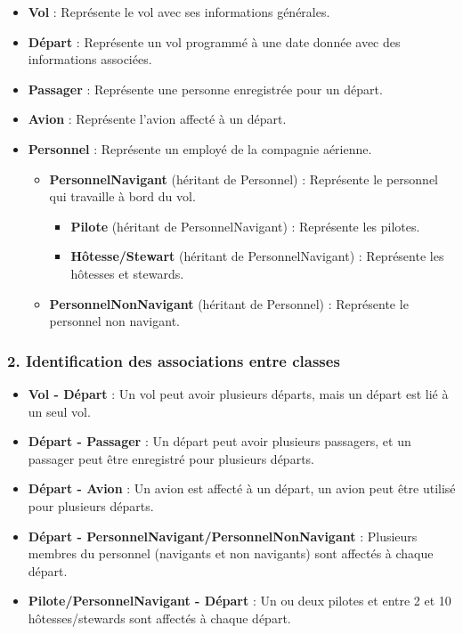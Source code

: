 \documentclass{article}
\begin{document}
\begin{itemize}
  \item \textbf{Vol} : Représente le vol avec ses informations générales.
  \item \textbf{Départ} : Représente un vol programmé à une date donnée avec des informations associées.
  \item \textbf{Passager} : Représente une personne enregistrée pour un départ.
  \item \textbf{Avion} : Représente l’avion affecté à un départ.
  \item \textbf{Personnel} : Représente un employé de la compagnie aérienne.
  \begin{itemize}
    \item \textbf{PersonnelNavigant} (héritant de Personnel) : Représente le personnel qui travaille à bord du vol.
    \begin{itemize}
      \item \textbf{Pilote} (héritant de PersonnelNavigant) : Représente les pilotes.
      \item \textbf{Hôtesse/Stewart} (héritant de PersonnelNavigant) : Représente les hôtesses et stewards.
    \end{itemize}
    \item \textbf{PersonnelNonNavigant} (héritant de Personnel) : Représente le personnel non navigant.
  \end{itemize}
\end{itemize}

\subsubsection*{2. Identification des associations entre classes}

\begin{itemize}
  \item \textbf{Vol - Départ} : Un vol peut avoir plusieurs départs, mais un départ est lié à un seul vol.
  \item \textbf{Départ - Passager} : Un départ peut avoir plusieurs passagers, et un passager peut être enregistré pour plusieurs départs.
  \item \textbf{Départ - Avion} : Un avion est affecté à un départ, un avion peut être utilisé pour plusieurs départs.
  \item \textbf{Départ - PersonnelNavigant/PersonnelNonNavigant} : Plusieurs membres du personnel (navigants et non navigants) sont affectés à chaque départ.
  \item \textbf{Pilote/PersonnelNavigant - Départ} : Un ou deux pilotes et entre 2 et 10 hôtesses/stewards sont affectés à chaque départ.
\end{itemize}
\end{document}
